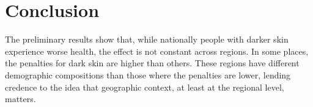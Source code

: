 \documentclass{article}
\begin{document}
\section{Conclusion}
The preliminary results show that, while nationally people with darker skin experience worse health, the effect is not constant across regions. In some places, the penalties for dark skin are higher than others. These regions have different demographic compositions than those where the penalties are lower, lending credence to the idea that geographic context, at least at the regional level, matters. 



\end{document}
